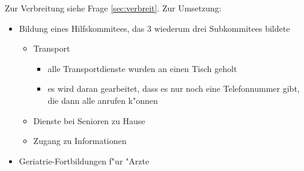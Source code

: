 Zur Verbreitung siehe Frage \ref{sec:verbreit}. Zur Umsetzung: 
\begin{itemize}
        \item Bildung eines Hilfskommitees, das 3 wiederum drei Subkommitees bildete
                \begin{itemize}
                        \item Transport
                                \begin{itemize}
                                        \item alle Transportdienste wurden an einen Tisch geholt
                                        \item es wird daran gearbeitet, dass es nur noch eine Telefonnummer gibt, die dann alle anrufen k"onnen
                                \end{itemize}
                        \item Dienste bei Senioren zu Hause
                        \item Zugang zu Informationen
                \end{itemize}
        \item Geriatrie-Fortbildungen f"ur "Arzte
\end{itemize}



